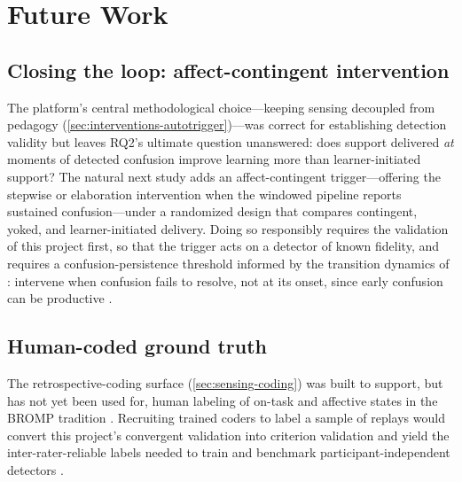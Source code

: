 \chapter{Future Work}
\label{ch:future}


\section{Closing the loop: affect-contingent intervention}
\label{sec:future-loop}

The platform's central methodological choice---keeping sensing decoupled
from pedagogy (\cref{sec:interventions-autotrigger})---was correct for
establishing detection validity but leaves RQ2's ultimate question
unanswered: does support delivered \emph{at} moments of detected confusion
improve learning more than learner-initiated support? The natural next
study adds an affect-contingent trigger---offering the stepwise or
elaboration intervention when the windowed pipeline reports sustained
confusion---under a randomized design that compares contingent, yoked, and
learner-initiated delivery. Doing so responsibly requires the validation
of this project first, so that the trigger acts on a detector of known
fidelity, and requires a confusion-persistence threshold informed by the
transition dynamics of \citet{dmello2012dynamics}: intervene when confusion
fails to resolve, not at its onset, since early confusion can be
productive \citep{dmello2014confusion}.

\section{Human-coded ground truth}
\label{sec:future-groundtruth}

The retrospective-coding surface (\cref{sec:sensing-coding}) was built to
support, but has not yet been used for, human labeling of on-task and
affective states in the BROMP tradition \citep{ocumpaugh2015}. Recruiting
trained coders to label a sample of replays would convert this project's
convergent validation into criterion validation and yield the
inter-rater-reliable labels needed to train and benchmark
participant-independent detectors \citep{whitehill2014, bosch2015}.

